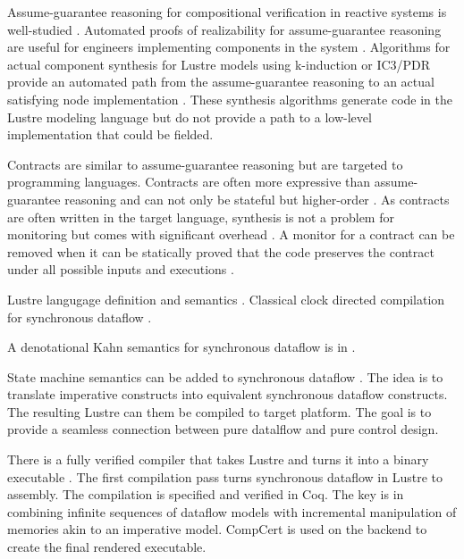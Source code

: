 Assume-guarantee reasoning for compositional verification in reactive systems is well-studied \cite{10.1007/978-3-642-28891-3_13, agree2013, 10.1145/2658982.2527272, 10.1007/978-3-319-17524-9_7}. Automated proofs of realizability for assume-guarantee reasoning are useful for engineers implementing components in the system \cite{10.1007/978-3-319-17524-9_13, 10.1007/978-3-319-29613-5_7}. Algorithms for actual component synthesis for Lustre models using k-induction or IC3/PDR provide an automated path from the assume-guarantee reasoning to an actual satisfying node implementation \cite{katis2017synthesis, 10.1007/978-3-319-89963-3_10}. These synthesis algorithms generate code in the Lustre modeling language but do not provide a path to a low-level implementation that could be fielded.

Contracts are similar to assume-guarantee reasoning but are targeted to programming languages. Contracts are often more expressive than assume-guarantee reasoning and can not only be stateful but higher-order \cite{10.1145/583852.581484}. As contracts are often written in the target language, synthesis is not a problem for monitoring but comes with significant overhead \cite{10.1007/978-3-642-28869-2_11}. A monitor for a contract can be removed when it can be statically proved that the code preserves the contract under all possible inputs and executions \cite{10.1145/3158139}.

Lustre langugage definition and semantics \cite{10.1145/41625.41641,97300}. Classical clock directed compilation for synchronous dataflow \cite{10.1145/1379023.1375674,10.1145/2345141.2248426}.

A denotational Kahn semantics for synchronous dataflow is in \cite{10.1007/978-3-540-45212-6_10}.

State machine semantics can be added to synchronous dataflow \cite{10.1145/1086228.1086261}. The idea is to translate imperative constructs into equivalent synchronous dataflow constructs. The resulting Lustre can them be compiled to target platform. The goal is to provide a seamless connection between pure datalflow and pure control design.

There is a fully verified compiler that takes Lustre and turns it into a binary executable \cite{10.1145/3140587.3062358}. The first compilation pass turns synchronous dataflow in Lustre to assembly. The compilation is specified and verified in Coq. The key is in combining infinite sequences of dataflow models with incremental manipulation of memories akin to an imperative model. CompCert is used on the backend to create the final rendered executable.